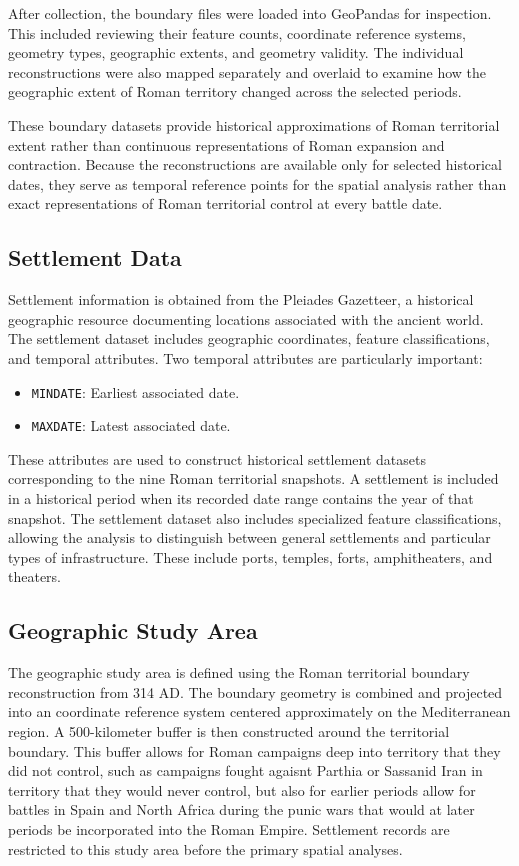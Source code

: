 \documentclass[
  letterpaper,
  DIV=11,
  numbers=noendperiod]{scrartcl}
\providecommand{\tightlist}{%
  \setlength{\itemsep}{0pt}\setlength{\parskip}{0pt}}\usepackage{longtable,booktabs,array}
\begin{document}
After collection, the boundary files were loaded into GeoPandas for
inspection. This included reviewing their feature counts, coordinate
reference systems, geometry types, geographic extents, and geometry
validity. The individual reconstructions were also mapped separately and
overlaid to examine how the geographic extent of Roman territory changed
across the selected periods.

These boundary datasets provide historical approximations of Roman
territorial extent rather than continuous representations of Roman
expansion and contraction. Because the reconstructions are available
only for selected historical dates, they serve as temporal reference
points for the spatial analysis rather than exact representations of
Roman territorial control at every battle date.

\subsection{Settlement Data}\label{settlement-data}

Settlement information is obtained from the Pleiades Gazetteer, a
historical geographic resource documenting locations associated with the
ancient world. The settlement dataset includes geographic coordinates,
feature classifications, and temporal attributes. Two temporal
attributes are particularly important:

\begin{itemize}
\tightlist
\item
  \texttt{MINDATE}: Earliest associated date.
\item
  \texttt{MAXDATE}: Latest associated date.
\end{itemize}

These attributes are used to construct historical settlement datasets
corresponding to the nine Roman territorial snapshots. A settlement is
included in a historical period when its recorded date range contains
the year of that snapshot. The settlement dataset also includes
specialized feature classifications, allowing the analysis to
distinguish between general settlements and particular types of
infrastructure. These include ports, temples, forts, amphitheaters, and
theaters.

\subsection{Geographic Study Area}\label{geographic-study-area}

The geographic study area is defined using the Roman territorial
boundary reconstruction from 314 AD. The boundary geometry is combined
and projected into an coordinate reference system centered approximately
on the Mediterranean region. A 500-kilometer buffer is then constructed
around the territorial boundary. This buffer allows for Roman campaigns
deep into territory that they did not control, such as campaigns fought
agaisnt Parthia or Sassanid Iran in territory that they would never
control, but also for earlier periods allow for battles in Spain and
North Africa during the punic wars that would at later periods be
incorporated into the Roman Empire. Settlement records are restricted to
this study area before the primary spatial analyses.
\end{document}
